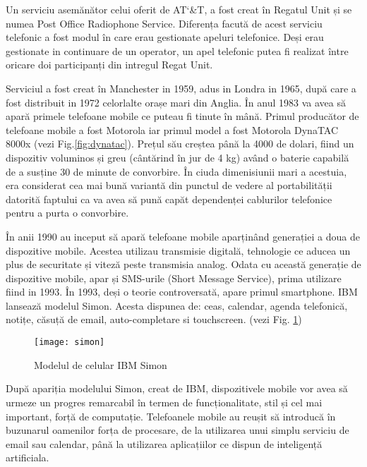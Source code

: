 	Un serviciu asemănător celui oferit de AT\char`&T, a fost creat în Regatul Unit și se numea Post Office Radiophone Service. Diferența facută de acest serviciu telefonic a fost modul în care erau gestionate apeluri telefonice. Deși erau gestionate in continuare de un operator, un apel telefonic putea fi realizat între oricare doi participanți din intregul Regat Unit. 
	
	Serviciul a fost creat în Manchester in 1959, adus in Londra in 1965, după care a fost distribuit in 1972 celorlalte orașe mari din Anglia.
	În anul 1983 va avea să apară primele telefoane mobile ce puteau fi tinute în mână. Primul producător de telefoane mobile a fost Motorola iar primul model a fost Motorola DynaTAC 8000x (vezi Fig.\ref{fig:dynatac}). Prețul său creștea până la 4000 de dolari, fiind un dispozitiv voluminos și greu (cântărind în jur de 4 kg)  având o baterie capabilă de a susține 30 de minute de convorbire. În ciuda dimenisiunii mari a acestuia, era considerat cea mai bună variantă din punctul de vedere al portabilității datorită faptului ca va avea să pună capăt dependenței cablurilor telefonice pentru a purta o convorbire.

	
	În anii 1990 au inceput să apară telefoane mobile aparținând generației a doua de dispozitive mobile. Acestea utilizau transmisie digitală, tehnologie ce aducea un plus de securitate și viteză peste transmisia analog. Odata cu această generație de dispozitive mobile, apar și SMS-urile (Short Message Service), prima utilizare fiind in 1993.
	În 1993, deși o teorie controversată, apare primul smartphone. IBM lansează modelul Simon. Acesta dispunea de: ceas, calendar, agenda telefonică, notițe, căsuță de email, auto-completare si touchscreen. (vezi Fig. \ref{fig:simon})
	
	
	
	\begin{figure}[H]
		\texttt{[image: simon]}  
		\caption{\label{fig:simon} Modelul de celular IBM Simon
			\protect
			\cite{ibm_simon}}
	\end{figure}
	
	
	După apariția modelului Simon, creat de IBM, dispozitivele mobile vor avea să urmeze un progres remarcabil în termen de funcționalitate, stil și cel mai important, forță de computație. 
	Telefoanele mobile au reușit să introducă în buzunarul oamenilor forța de procesare, de la utilizarea unui simplu serviciu de email sau calendar, până la utilizarea aplicațiilor ce dispun de inteligență artificiala. \cite{history_cellphones}
	\newline
	
